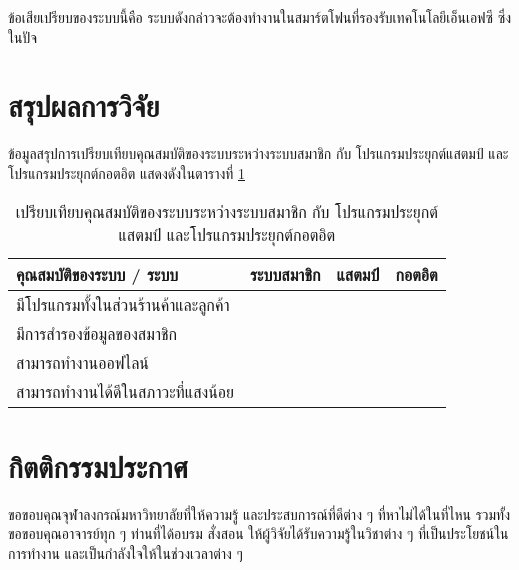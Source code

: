 \documentclass[12pt,a4paper,twocolumn]{article}
\newcommand{\cmark}{\ding{51}}
\newcommand{\xmark}{\ding{55}}
\begin{document}
ข้อเสียเปรียบของระบบนี้คือ ระบบดังกล่าวจะต้องทำงานในสมาร์ตโฟนที่รองรับเทคโนโลยีเอ็นเอฟซี ซึ่งในปัจ
\section{สรุปผลการวิจัย}
ข้อมูลสรุปการเปรียบเทียบคุณสมบัติของระบบระหว่างระบบสมาชิก กับ โปรแกรมประยุกต์แสตมป์ และโปรแกรมประยุกต์กอตอิต แสดงดังในตารางที่ \ref{tab:compare_feature}

\begin{table}[ht!]
\centering
\resizebox{81mm}{!} {
\begin{tabular}{ | l | c | c | c |}
	\hline                        
  	คุณสมบัติของระบบ / ระบบ            	& ระบบสมาชิก & แสตมป์ & กอตอิต \\
  	\hline 
  	มีโปรแกรมทั้งในส่วนร้านค้าและลูกค้า 	& \cmark & \xmark & \xmark \\
  	\hline
  	มีการสำรองข้อมูลของสมาชิก				& \cmark & \cmark & \cmark \\
  	\hline
  	สามารถทำงานออฟไลน์                 	& \cmark & \cmark & \cmark \\
  	\hline
  	สามารถทำงานได้ดีในสภาวะที่แสงน้อย    	& \cmark & \cmark & \xmark \\
  	\hline
\end{tabular}
}
\caption{เปรียบเทียบคุณสมบัติของระบบระหว่างระบบสมาชิก กับ โปรแกรมประยุกต์แสตมป์ และโปรแกรมประยุกต์กอตอิต}
\label{tab:compare_feature}
\end{table}

\section{กิตติกรรมประกาศ}
ขอขอบคุณจุฬาลงกรณ์มหาวิทยาลัยที่ให้ความรู้ และประสบการณ์ที่ดีต่าง ๆ ที่หาไม่ได้ในที่ไหน รวมทั้งขอขอบคุณอาจารย์ทุก ๆ ท่านที่ได้อบรม สั่งสอน ให้ผู้วิจัยได้รับความรู้ในวิชาต่าง ๆ ที่เป็นประโยชน์ในการทำงาน และเป็นกำลังใจให้ในช่วงเวลาต่าง ๆ
\end{document}
